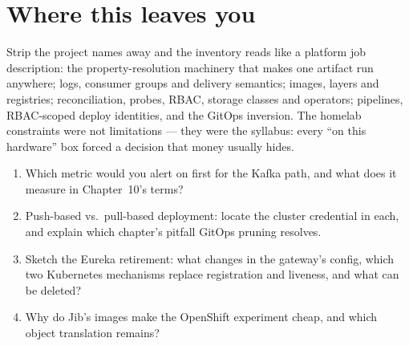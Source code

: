 \section{Where this leaves you}

Strip the project names away and the inventory reads like a platform
job description: the property-resolution machinery that makes one
artifact run anywhere; logs, consumer groups and delivery semantics;
images, layers and registries; reconciliation, probes, RBAC, storage
classes and operators; pipelines, RBAC-scoped deploy identities, and
the GitOps inversion. The homelab constraints were not limitations ---
they were the syllabus: every ``on this hardware'' box forced a
decision that money usually hides.

\begin{quiz}
\begin{enumerate}
  \item Which metric would you alert on first for the Kafka path, and
  what does it measure in Chapter~10's terms?
  \item Push-based vs.\ pull-based deployment: locate the cluster
  credential in each, and explain which chapter's pitfall GitOps
  pruning resolves.
  \item Sketch the Eureka retirement: what changes in the gateway's
  config, which two Kubernetes mechanisms replace registration and
  liveness, and what can be deleted?
  \item Why do Jib's images make the OpenShift experiment cheap, and
  which object translation remains?
\end{enumerate}
\end{quiz}
